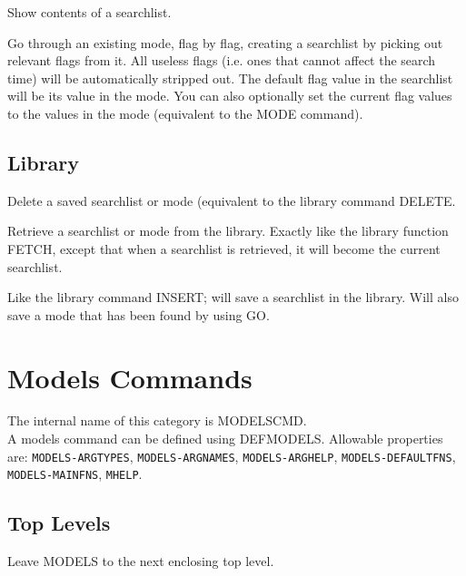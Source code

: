 \begin{description}
\item[SHOW-SEARCHLIST]  
Show contents of a searchlist.

\item[VARY-MODE]  
Go through an existing mode, flag by flag, creating a searchlist
by picking out relevant flags from it. All useless flags (i.e. ones that 
cannot affect the search time) will be automatically stripped out. The
default flag value in the searchlist will be its value in the mode.
You can also optionally set the current flag values to the values 
in the mode (equivalent to the MODE command).
\item
\end{description}

\section{Library}

\begin{description} 
\item[DELETE]  
Delete a saved searchlist or mode (equivalent to the library
command DELETE.

\item[FETCH]  
Retrieve a searchlist or mode from the library. Exactly like the 
library function FETCH, except that when a searchlist is retrieved, it
will become the current searchlist.

\item[INSERT]  
Like the library command INSERT; will save a 
searchlist in the library. Will also save a mode that has been found 
by using GO.
\item
\end{description}
\chapter{Models Commands}
The internal name of this category is 
MODELSCMD.\\
A models command can be defined using DEFMODELS.
Allowable properties are: \texttt{MODELS-ARGTYPES}, \texttt{MODELS-ARGNAMES}, \texttt{MODELS-ARGHELP}, \texttt{MODELS-DEFAULTFNS}, \texttt{MODELS-MAINFNS}, \texttt{MHELP}.

\section{Top Levels}

\begin{description} 
\item[LEAVE]  
Leave MODELS to the next enclosing top level.
\item
\end{description}

